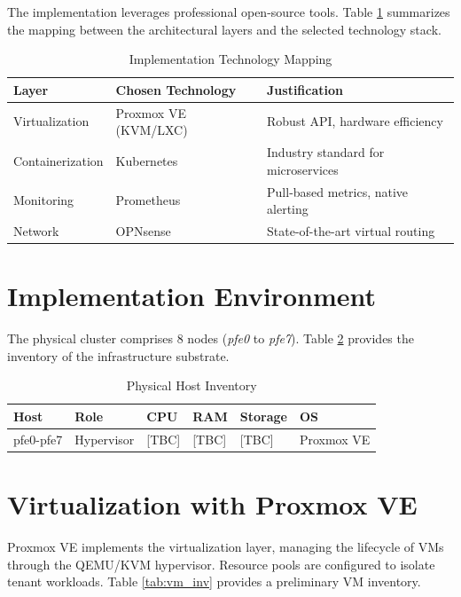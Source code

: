 \documentclass[12pt,a4paper]{report}
\begin{document}
The implementation leverages professional open-source tools. Table \ref{tab:tech_stack} summarizes the mapping between the architectural layers and the selected technology stack.

\begin{table}[htbp]
\centering
\caption{Implementation Technology Mapping}
\label{tab:tech_stack}
\begin{tabular}{@{}lll@{}}
\toprule
\textbf{Layer} & \textbf{Chosen Technology} & \textbf{Justification} \\ \midrule
Virtualization & Proxmox VE (KVM/LXC) & Robust API, hardware efficiency \\
Containerization & Kubernetes & Industry standard for microservices \\
Monitoring & Prometheus & Pull-based metrics, native alerting \\
Network & OPNsense & State-of-the-art virtual routing \\ \bottomrule
\end{tabular}
\end{table}

\section{Implementation Environment}

The physical cluster comprises 8 nodes (\textit{pfe0} to \textit{pfe7}). Table \ref{tab:physical_hosts} provides the inventory of the infrastructure substrate.

\begin{table}[htbp]
\centering
\caption{Physical Host Inventory}
\label{tab:physical_hosts}
\begin{tabular}{@{}llllll@{}}
\toprule
\textbf{Host} & \textbf{Role} & \textbf{CPU} & \textbf{RAM} & \textbf{Storage} & \textbf{OS} \\ \midrule
pfe0-pfe7 & Hypervisor & [TBC] & [TBC] & [TBC] & Proxmox VE \\ \bottomrule
\end{tabular}
\end{table}

\section{Virtualization with Proxmox VE}

Proxmox VE implements the virtualization layer, managing the lifecycle of VMs through the QEMU/KVM hypervisor. Resource pools are configured to isolate tenant workloads. Table \ref{tab:vm_inv} provides a preliminary VM inventory.
\end{document}
